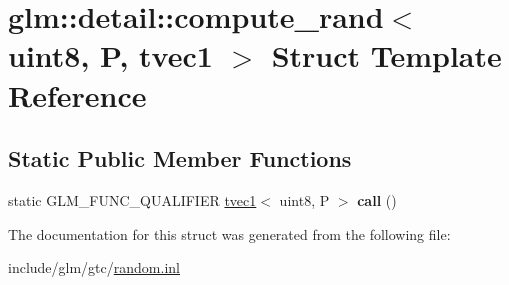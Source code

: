 \hypertarget{structglm_1_1detail_1_1compute__rand_3_01uint8_00_01P_00_01tvec1_01_4}{}\section{glm\+:\+:detail\+:\+:compute\+\_\+rand$<$ uint8, P, tvec1 $>$ Struct Template Reference}
\label{structglm_1_1detail_1_1compute__rand_3_01uint8_00_01P_00_01tvec1_01_4}
\subsection*{Static Public Member Functions}
\begin{DoxyCompactItemize}
\item 
\mbox{\label{structglm_1_1detail_1_1compute__rand_3_01uint8_00_01P_00_01tvec1_01_4_abdfb11bac3bebc1ea1a6a77445291fd0}} 
static G\+L\+M\+\_\+\+F\+U\+N\+C\+\_\+\+Q\+U\+A\+L\+I\+F\+I\+ER \hyperlink{structglm_1_1tvec1}{tvec1}$<$ uint8, P $>$ {\bfseries call} ()
\end{DoxyCompactItemize}


The documentation for this struct was generated from the following file\+:\begin{DoxyCompactItemize}
\item 
include/glm/gtc/\hyperlink{random_8inl}{random.\+inl}\end{DoxyCompactItemize}
